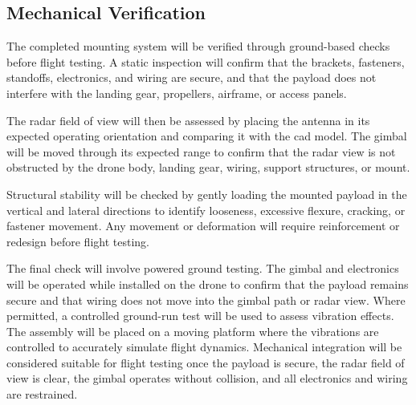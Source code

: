 \subsection{Mechanical Verification}

The completed mounting system will be verified through ground-based checks before flight testing. A static inspection will confirm that the brackets, fasteners, standoffs, electronics, and wiring are secure, and that the payload does not interfere with the landing gear, propellers, airframe, or access panels.

The radar field of view will then be assessed by placing the antenna in its expected operating orientation and comparing it with the \gls{cad} model. The gimbal will be moved through its expected range to confirm that the radar view is not obstructed by the drone body, landing gear, wiring, support structures, or mount.

Structural stability will be checked by gently loading the mounted payload in the vertical and lateral directions to identify looseness, excessive flexure, cracking, or fastener movement. Any movement or deformation will require reinforcement or redesign before flight testing.

The final check will involve powered ground testing. The gimbal and electronics will be operated while installed on the drone to confirm that the payload remains secure and that wiring does not move into the gimbal path or radar view. Where permitted, a controlled ground-run test will be used to assess vibration effects. The assembly will be placed on a moving platform where the vibrations are controlled to accurately simulate flight dynamics. Mechanical integration will be considered suitable for flight testing once the payload is secure, the radar field of view is clear, the gimbal operates without collision, and all electronics and wiring are restrained.